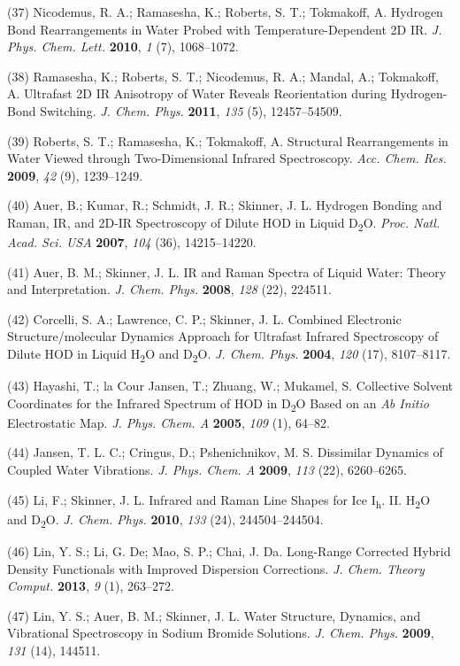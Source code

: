 \documentclass[]{article}
\begin{document}
(37) Nicodemus, R. A.; Ramasesha, K.; Roberts, S. T.; Tokmakoff, A.
Hydrogen Bond Rearrangements in Water Probed with Temperature-Dependent
2D IR. \emph{J. Phys. Chem. Lett.} \textbf{2010}, \emph{1} (7),
1068--1072.

(38) Ramasesha, K.; Roberts, S. T.; Nicodemus, R. A.; Mandal, A.;
Tokmakoff, A. Ultrafast 2D IR Anisotropy of Water Reveals Reorientation
during Hydrogen-Bond Switching. \emph{J. Chem. Phys.} \textbf{2011},
\emph{135} (5), 12457--54509.

(39) Roberts, S. T.; Ramasesha, K.; Tokmakoff, A. Structural
Rearrangements in Water Viewed through Two-Dimensional Infrared
Spectroscopy. \emph{Acc. Chem. Res.} \textbf{2009}, \emph{42} (9),
1239--1249.

(40) Auer, B.; Kumar, R.; Schmidt, J. R.; Skinner, J. L. Hydrogen
Bonding and Raman, IR, and 2D-IR Spectroscopy of Dilute HOD in Liquid
D\textsubscript{2}O. \emph{Proc. Natl. Acad. Sci. USA} \textbf{2007},
\emph{104} (36), 14215--14220.

(41) Auer, B. M.; Skinner, J. L. IR and Raman Spectra of Liquid Water:
Theory and Interpretation. \emph{J. Chem. Phys.} \textbf{2008},
\emph{128} (22), 224511.

(42) Corcelli, S. A.; Lawrence, C. P.; Skinner, J. L. Combined
Electronic Structure/molecular Dynamics Approach for Ultrafast Infrared
Spectroscopy of Dilute HOD in Liquid H\textsubscript{2}O and
D\textsubscript{2}O. \emph{J. Chem. Phys.} \textbf{2004}, \emph{120}
(17), 8107--8117.

(43) Hayashi, T.; la Cour Jansen, T.; Zhuang, W.; Mukamel, S. Collective
Solvent Coordinates for the Infrared Spectrum of HOD in
D\textsubscript{2}O Based on an \emph{Ab Initio} Electrostatic Map.
\emph{J. Phys. Chem. A} \textbf{2005}, \emph{109} (1), 64--82.

(44) Jansen, T. L. C.; Cringus, D.; Pshenichnikov, M. S. Dissimilar
Dynamics of Coupled Water Vibrations. \emph{J. Phys. Chem. A}
\textbf{2009}, \emph{113} (22), 6260--6265.

(45) Li, F.; Skinner, J. L. Infrared and Raman Line Shapes for Ice
I\textsubscript{h}. II. H\textsubscript{2}O and D\textsubscript{2}O.
\emph{J. Chem. Phys.} \textbf{2010}, \emph{133} (24), 244504--244504.

(46) Lin, Y. S.; Li, G. De; Mao, S. P.; Chai, J. Da. Long-Range
Corrected Hybrid Density Functionals with Improved Dispersion
Corrections. \emph{J. Chem. Theory Comput.} \textbf{2013}, \emph{9} (1),
263--272.

(47) Lin, Y. S.; Auer, B. M.; Skinner, J. L. Water Structure, Dynamics,
and Vibrational Spectroscopy in Sodium Bromide Solutions. \emph{J. Chem.
Phys.} \textbf{2009}, \emph{131} (14), 144511.
\end{document}

